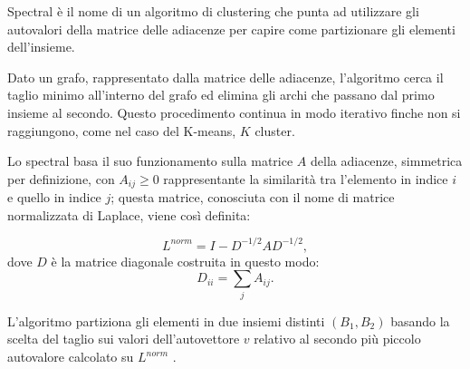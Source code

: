 Spectral è il nome di un algoritmo di clustering che punta ad utilizzare gli autovalori della matrice delle adiacenze per capire come partizionare gli elementi dell'insieme.

Dato un grafo, rappresentato dalla matrice delle adiacenze, l'algoritmo cerca il taglio minimo all'interno del grafo ed elimina gli archi che passano dal primo insieme al secondo. Questo procedimento continua in modo iterativo finche non si raggiungono, come nel caso del K-means, $K$ cluster.

Lo spectral basa il suo funzionamento sulla matrice $A$ della adiacenze, simmetrica per definizione, con $A_{ij}\geq 0$ rappresentante la similarità tra l'elemento in indice $i$ e quello in indice $j$; questa matrice, conosciuta con il nome di matrice normalizzata di Laplace, viene così definita:

\begin{equation*}
	L^{norm} = I-D^{-1/2} A D^{-1/2},
\end{equation*}
dove $D$ è la matrice diagonale costruita in questo modo:
\begin{equation*}
	D_{ii} = \sum_j A_{ij}.
\end{equation*}

L'algoritmo partiziona gli elementi in due insiemi distinti $(B_1, B_2)$ basando la scelta del taglio sui valori dell'autovettore $v$ relativo al secondo più piccolo autovalore calcolato su $L^{norm}$ \cite{spectral}.